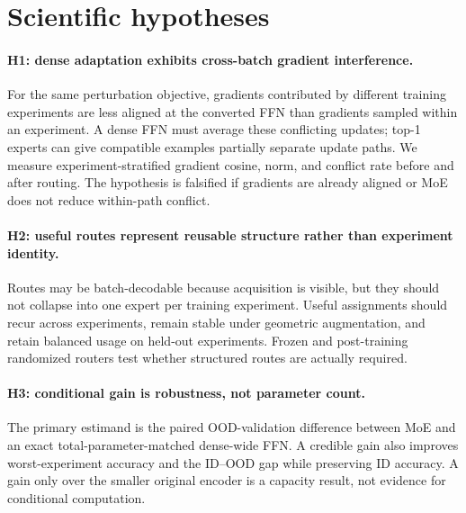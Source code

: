 \section{Scientific hypotheses}

\paragraph{H1: dense adaptation exhibits cross-batch gradient interference.}
For the same perturbation objective, gradients contributed by different training experiments are
less aligned at the converted FFN than gradients sampled within an experiment. A dense FFN must
average these conflicting updates; top-1 experts can give compatible examples partially separate
update paths. We measure experiment-stratified gradient cosine, norm, and conflict rate before and
after routing. The hypothesis is falsified if gradients are already aligned or MoE does not reduce
within-path conflict.

\paragraph{H2: useful routes represent reusable structure rather than experiment identity.}
Routes may be batch-decodable because acquisition is visible, but they should not collapse into one
expert per training experiment. Useful assignments should recur across experiments, remain stable
under geometric augmentation, and retain balanced usage on held-out experiments. Frozen and
post-training randomized routers test whether structured routes are actually required.

\paragraph{H3: conditional gain is robustness, not parameter count.}
The primary estimand is the paired OOD-validation difference between MoE and an exact
total-parameter-matched dense-wide FFN. A credible gain also improves worst-experiment accuracy and
the ID--OOD gap while preserving ID accuracy. A gain only over the smaller original encoder is a
capacity result, not evidence for conditional computation.
